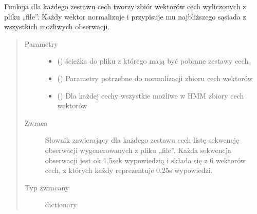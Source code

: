 \documentclass[letterpaper,10pt,polish]{sphinxmanual}
\begin{document}
\begin{fulllineitems}
\label{\detokenize{hmm_main:hmm_main.hmm_get_observations_vectors}}
Funkcja dla każdego zestawu cech tworzy zbiór wektorów cech wyliczonych z pliku „file”.
Każdy wektor normalizuje i przypisuje mu najbliższego sąsiada z wszystkich możliwych obserwacji.
\begin{quote}\begin{description}
\item[{Parametry}] \leavevmode\begin{itemize}
\item {} 
 () \textendash{} ścieżka do pliku z którego mają być pobrane zestawy cech

\item {} 
 () \textendash{} Parametry potrzebne do normalizacji zbioru cech wektorów

\item {} 
 (\sphinxstyleliteralemphasis{{[}}\sphinxstyleliteralemphasis{{]}}) \textendash{} Dla każdej cechy wszystkie możliwe w HMM zbiory cech wektorów

\end{itemize}

\item[{Zwraca}] \leavevmode
Słownik zawierający dla każdego zestawu cech listę sekwencję obserwacji wygenerowanych z pliku „file”.
Każda sekwencja obserwacji jest ok 1,5sek wypowiedzią i składa się z 6 wektorów cech,
z których każdy reprezentuje 0,25s wypowiedzi.

\item[{Typ zwracany}] \leavevmode
dictionary

\end{description}\end{quote}

\end{fulllineitems}

\end{document}
